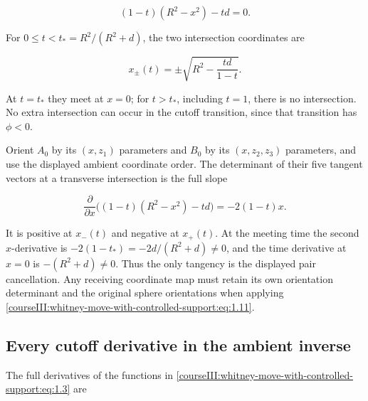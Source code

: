 \begin{equation}
(1-t)(R^2-x^2)-td=0.
\label{courseIII:whitney-move-with-controlled-support:eq:1.9}
\end{equation}

For \(0\leq t<t_*=R^2/(R^2+d)\), the two intersection coordinates are

\begin{equation}
x_\pm(t)=\pm\sqrt{R^2-\frac{td}{1-t}}.
\label{courseIII:whitney-move-with-controlled-support:eq:1.10}
\end{equation}

At \(t=t_*\) they meet at \(x=0\); for \(t>t_*\), including \(t=1\), there is no intersection. No extra intersection can occur in the cutoff transition, since that transition has \(\phi<0\).

Orient \(A_0\) by its \((x,z_1)\) parameters and \(B_0\) by its \((x,z_2,z_3)\) parameters, and use the displayed ambient coordinate order. The determinant of their five tangent vectors at a transverse intersection is the full slope

\begin{equation}
\frac{\partial}{\partial x}\bigl((1-t)(R^2-x^2)-td\bigr)
=-2(1-t)x.
\label{courseIII:whitney-move-with-controlled-support:eq:1.11}
\end{equation}

It is positive at \(x_-(t)\) and negative at \(x_+(t)\). At the meeting time the second \(x\)-derivative is
\(-2(1-t_*)=-2d/(R^2+d)\ne0\), and the time derivative at \(x=0\) is
\(-(R^2+d)\ne0\). Thus the only tangency is the displayed pair cancellation. Any receiving coordinate map must retain its own orientation determinant and the original sphere orientations when applying \eqref{courseIII:whitney-move-with-controlled-support:eq:1.11}.

\subsection{Every cutoff derivative in the ambient inverse}
\label{courseIII:whitney-move-with-controlled-support:move-full-derivative}

\label{courseIII:whitney-move-with-controlled-support:section-2}\label{courseIII:whitney-support:2}

The full derivatives of the functions in \eqref{courseIII:whitney-move-with-controlled-support:eq:1.3} are

